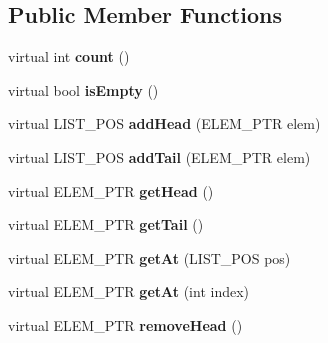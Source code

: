 \subsection*{Public Member Functions}
\begin{DoxyCompactItemize}
\item 
\hypertarget{class_c_list_aba5942fb294f8f3381bef96ffc8f5054}{virtual int {\bfseries count} ()}\label{class_c_list_aba5942fb294f8f3381bef96ffc8f5054}

\item 
\hypertarget{class_c_list_ab4db98accd12debb4330ad97b8b1dc37}{virtual bool {\bfseries is\-Empty} ()}\label{class_c_list_ab4db98accd12debb4330ad97b8b1dc37}

\item 
\hypertarget{class_c_list_af77b9f95976788ad6b74e825fad12e94}{virtual L\-I\-S\-T\-\_\-\-P\-O\-S {\bfseries add\-Head} (E\-L\-E\-M\-\_\-\-P\-T\-R elem)}\label{class_c_list_af77b9f95976788ad6b74e825fad12e94}

\item 
\hypertarget{class_c_list_a81c34b9127ccce385b6699b9eaa799d1}{virtual L\-I\-S\-T\-\_\-\-P\-O\-S {\bfseries add\-Tail} (E\-L\-E\-M\-\_\-\-P\-T\-R elem)}\label{class_c_list_a81c34b9127ccce385b6699b9eaa799d1}

\item 
\hypertarget{class_c_list_acc4c74c1684f630c99988a477b0a3eb7}{virtual E\-L\-E\-M\-\_\-\-P\-T\-R {\bfseries get\-Head} ()}\label{class_c_list_acc4c74c1684f630c99988a477b0a3eb7}

\item 
\hypertarget{class_c_list_a4bb6b07562fdd0cc376e7f300ed3b9c0}{virtual E\-L\-E\-M\-\_\-\-P\-T\-R {\bfseries get\-Tail} ()}\label{class_c_list_a4bb6b07562fdd0cc376e7f300ed3b9c0}

\item 
\hypertarget{class_c_list_a54795f456c006f4ab3647d5abfaa806c}{virtual E\-L\-E\-M\-\_\-\-P\-T\-R {\bfseries get\-At} (L\-I\-S\-T\-\_\-\-P\-O\-S pos)}\label{class_c_list_a54795f456c006f4ab3647d5abfaa806c}

\item 
\hypertarget{class_c_list_abec03f2f356c1bcd44ff3ddfa3e1e65a}{virtual E\-L\-E\-M\-\_\-\-P\-T\-R {\bfseries get\-At} (int index)}\label{class_c_list_abec03f2f356c1bcd44ff3ddfa3e1e65a}

\item 
\hypertarget{class_c_list_a0e0dfa3bc3d93b9708d4a454e91d0994}{virtual E\-L\-E\-M\-\_\-\-P\-T\-R {\bfseries remove\-Head} ()}\label{class_c_list_a0e0dfa3bc3d93b9708d4a454e91d0994}


\end{DoxyCompactItemize}
